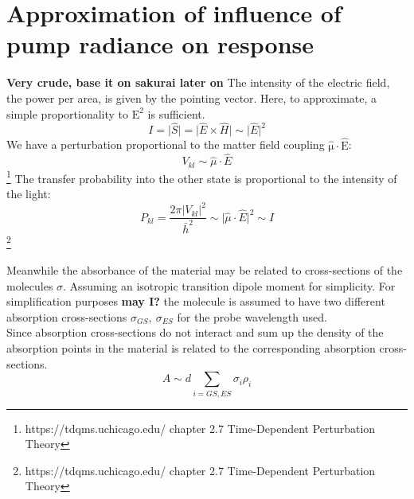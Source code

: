 \documentclass[twoside,openright]{scrreprt}
\begin{document}
\section{Approximation of influence of pump radiance on response}
\textbf{Very crude, base it on sakurai later on}
The intensity of the electric field, the power per area, is given by the pointing vector. Here, to approximate, a simple proportionality to  $\mathrm{E^2}$ is sufficient.
\begin{equation*}
I =  \lvert  \hat{S} \rvert =  \lvert \hat{E} \times \hat{H} \rvert  \sim \lvert \hat{E} \rvert^2
\end{equation*}
We have a perturbation proportional to the matter field coupling $\mathrm{\hat{\mu}\cdot \hat{E}}$:
\begin{equation}
V_{kl} \sim \hat{\mu}\cdot\hat{E}
\end{equation}\footnote{https://tdqms.uchicago.edu/ chapter 2.7 Time-Dependent Perturbation Theory}
The transfer probability into the other state is proportional to the intensity of the light:
\begin{equation*}
P_{kl} = \frac{2\pi \lvert V_{kl}\rvert^2}{\bar{h}^2} \sim \lvert \hat{\mu}\cdot\hat{E}\rvert^2 \sim I
\end{equation*}\footnote{https://tdqms.uchicago.edu/ chapter 2.7 Time-Dependent Perturbation Theory}

Meanwhile the absorbance of the material may be related to  cross-sections of the molecules $\sigma$. Assuming an isotropic transition dipole moment for simplicity. For simplification purposes \textbf{may I?} the molecule is assumed to have two different absorption cross-sections $\sigma_{GS},\ \sigma_{ES}$ for the probe wavelength used.\\
Since absorption cross-sections do not interact and sum up the density of the absorption points in the material is related to the corresponding absorption cross-sections.
\begin{equation}
A \sim d \sum_{i=GS, ES} \sigma_{i} \rho_i
\end{equation}
\end{document}
